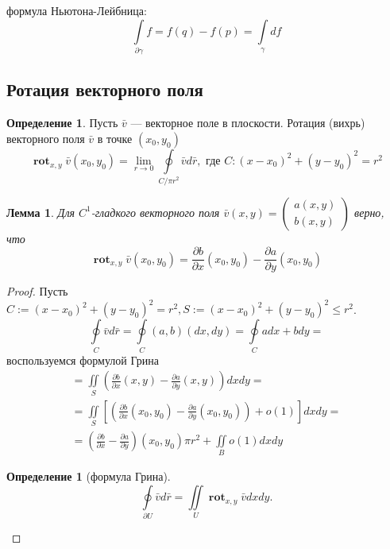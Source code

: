 \documentclass[a5paper]{article}
\newcounter{through}
\theoremstyle{plain}
\newtheorem{lemma}[through]{Лемма}
\theoremstyle{definition}
\newtheorem{definition}[through]{Определение}
\numberwithin{through}{section}
\numberwithin{equation}{section}
\DeclareMathOperator{\rot}{\textbf{rot}}
\begin{document}
формула Ньютона-Лейбница:
\[\int\limits_{\partial \gamma} f = f(q) - f(p) = \int\limits_{\gamma} df \]


\subsection{Ротация векторного поля}
\begin{definition}
	Пусть $\bar{v}$ --- векторное поле в плоскости. 
	Ротация (вихрь) векторного поля $\bar{v}$ в точке $(x_0, y_0)$ 
	\[\rot_{x, y} \bar{v} (x_0, y_0) = 
	\lim\limits_{r \to 0} \oint\limits_{C\slash \pi r^{2}} \bar{v}d\bar{r}, \text{ где } C: (x-x_0)^2 + (y - y_0)^2 = r^2 \]
\end{definition}
\begin{lemma}
	Для $C^1$-гладкого векторного поля $\bar{v}(x,y) = 
	\begin{pmatrix}
	a(x,y) \\
	b(x,y)
	\end{pmatrix}$ верно, что 
	\begin{equation*}
		\rot_{x, y} \bar{v}(x_0, y_0) = \frac{\partial b}{\partial x}(x_0, y_0) - \frac{\partial a}{\partial y}(x_0, y_0)
	\end{equation*} 
\end{lemma}
\begin{proof}
	Пусть $C := (x-x_0)^2 + (y - y_0)^2 = r^2, S:=(x-x_0)^2 + (y - y_0)^2 \leq r^2 $. 
	\begin{equation*}
	\oint\limits_C \bar{v}d\bar{r} = \oint\limits_C (a, b)(dx, dy) = \oint\limits_C adx + bdy = 
	\end{equation*}
	воспользуемся формулой Грина
	\begin{eqnarray}
	= \iint\limits_S \left( \frac{\partial b}{\partial x}(x, y) - \frac{\partial a}{\partial y}(x, y) \right)dxdy = \nonumber\\
	= \iint\limits_S \left[ \left( \frac{\partial b}{\partial x}(x_0, y_0) - \frac{\partial a}{\partial y}(x_0, y_0) \right) + o(1) \right]
	dxdy = \nonumber \\
	= \left( \frac{\partial b}{\partial x} - \frac{\partial a}{\partial y} \right)(x_0, y_0) \pi r^2 + \iint\limits_B o(1)dxdy
	\nonumber
	\end{eqnarray}  
	
	\begin{definition}[формула Грина]
		\begin{equation*}
		\oint\limits_{\partial U} \bar{v} d\bar{r} = \iint\limits_U \rot_{x,y} \bar{v} dxdy.
		\end{equation*}
	\end{definition}
\end{proof}
\end{document}
